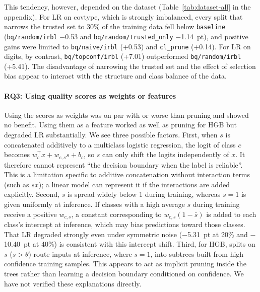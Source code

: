 \documentclass[a4paper,10pt]{article}
\newcommand{\method}[1]{\texttt{#1}}
\begin{document}
This tendency, however, depended on the dataset (Table~\ref{tab:dataset-all} in the appendix).
For LR on covtype, which is strongly imbalanced, every split that narrows the trusted set to 30\% of the training data fell below \method{baseline} (\method{bq/random/irbl} $-$0.53 and \method{bq/random/trusted\_only} $-$1.14~pt), and positive gains were limited to \method{bq/naive/irbl} (+0.53) and \method{cl\_prune} (+0.14).
For LR on digits, by contrast, \method{bq/topconf/irbl} (+7.01) outperformed \method{bq/random/irbl} (+5.41).
The disadvantage of narrowing the trusted set and the effect of selection bias appear to interact with the structure and class balance of the data.

\paragraph{RQ3: Using quality scores as weights or features}
Using the scores as weights was on par with or worse than pruning and showed no benefit.
Using them as a feature worked as well as pruning for HGB but degraded LR substantially.
We see three possible factors.
First, when $s$ is concatenated additively to a multiclass logistic regression, the logit of class $c$ becomes $w_c^\top x + w_{c,s} s + b_c$, so $s$ can only shift the logits independently of $x$.
It therefore cannot represent ``the decision boundary when the label is reliable''.
This is a limitation specific to additive concatenation without interaction terms (such as $s x$); a linear model can represent it if the interactions are added explicitly.
Second, $s$ is spread widely below 1 during training, whereas $s=1$ is given uniformly at inference.
If classes with a high average $s$ during training receive a positive $w_{c,s}$, a constant corresponding to $w_{c,s}(1 - \bar{s})$ is added to each class's intercept at inference, which may bias predictions toward those classes.
That LR degraded strongly even under symmetric noise ($-$5.31~pt at 20\% and $-$10.40~pt at 40\%) is consistent with this intercept shift.
Third, for HGB, splits on $s$ ($s > \theta$) route inputs at inference, where $s=1$, into subtrees built from high-confidence training samples.
This appears to act as implicit pruning inside the trees rather than learning a decision boundary conditioned on confidence.
We have not verified these explanations directly.
\end{document}
